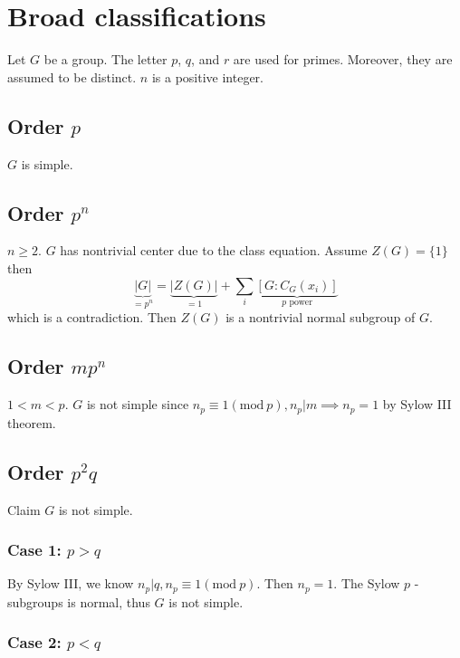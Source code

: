 \section{Broad classifications}

Let $G$ be a group. The letter $p$, $q$, and $r$ are used for primes. Moreover, they are assumed to be distinct. $n$ is a positive integer.

\subsection{Order \texorpdfstring{$p$}{p}}

$G$ is simple.

\subsection{Order \texorpdfstring{$p^{n}$}{p^n}}

$n\geq2$. $G$ has nontrivial center due to the class equation. Assume $Z(G)=\{ 1 \}$ then
\[
\underbrace{ \lvert G \rvert }_{ =p^{n} } =\underbrace{ \lvert Z(G) \rvert }_{ =1 } +\sum_{i}\underbrace{ [G:C_{G}(x_i)] }_{ p\text{ power} }
\]
which is a contradiction. Then $Z(G)$ is a nontrivial normal subgroup of $G$.

\subsection{Order \texorpdfstring{$mp^{n}$}{mp^n}}

$1<m<p$. $G$ is not simple since $n_{p}\equiv1(\mathrm{mod}\ p),n_{p}|m\implies n_{p}=1$ by Sylow III theorem.

\subsection{Order \texorpdfstring{$p^2q$}{p^2q}}

Claim $G$ is not simple.

\subsubsection{Case 1: \texorpdfstring{$p>q$}{p>q}}

By Sylow III, we know $n_{p}|q,n_{p}\equiv1(\mathrm{mod}\ p)$. Then $n_{p}=1$. The Sylow $p$ -subgroups is normal, thus $G$ is not simple.

\subsubsection{Case 2: \texorpdfstring{$p<q$}{p<q}}

